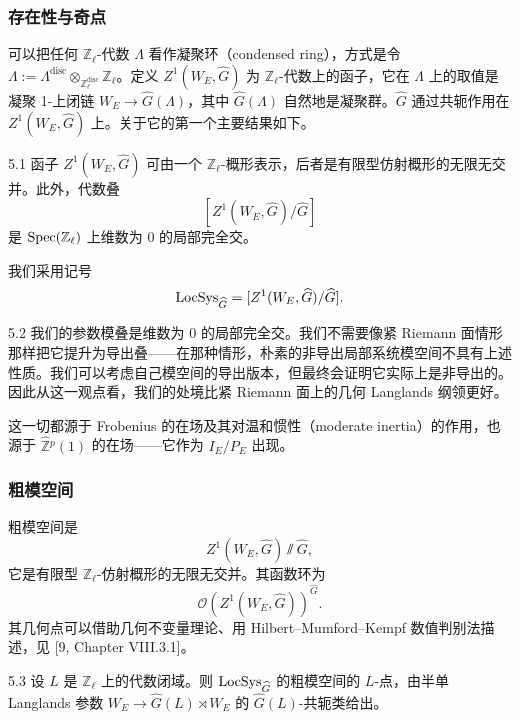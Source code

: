 \subsubsection{存在性与奇点}
可以把任何 $\mathbb{Z}_{\ell}$-代数 $\Lambda$ 看作凝聚环（condensed ring），方式是令 $\Lambda:=\Lambda^{\mathrm{disc}}\otimes_{\mathbb{Z}_{\ell}^{\mathrm{disc}}}\mathbb{Z}_{\ell}$。定义 $Z^{1}(W_{E},\widehat{G})$ 为 $\mathbb{Z}_{\ell}$-代数上的函子，它在 $\Lambda$ 上的取值是凝聚 1-上闭链 $W_{E}\to\widehat{G}(\Lambda)$，其中 $\widehat{G}(\Lambda)$ 自然地是凝聚群。$\widehat{G}$ 通过共轭作用在 $Z^{1}(W_{E},\widehat{G})$ 上。关于它的第一个主要结果如下。

\begin{thm}{5.1}
函子 $Z^{1}(W_{E},\widehat{G})$ 可由一个 $\mathbb{Z}_{\ell}$-概形表示，后者是有限型仿射概形的无限无交并。此外，代数叠
\[
[Z^{1}(W_{E},\widehat{G})/\widehat{G}]
\]
是 $\operatorname{Spec}(\mathbb{Z}_{\ell})$ 上维数为 0 的局部完全交。
\label{thm:a3-5-1}
\end{thm}

我们采用记号
\[
\operatorname{LocSys}_{\widehat{G}}=[Z^{1}(W_{E},\widehat{G})/\widehat{G}].
\]

\begin{rem}{5.2}
我们的参数模叠是维数为 0 的局部完全交。我们不需要像紧 Riemann 面情形那样把它提升为导出叠——在那种情形，朴素的非导出局部系统模空间不具有上述性质。我们可以考虑自己模空间的导出版本，但最终会证明它实际上是非导出的。因此从这一观点看，我们的处境比紧 Riemann 面上的几何 Langlands 纲领更好。
\label{rem:a3-5-2}
\end{rem}

这一切都源于 Frobenius 的在场及其对温和惯性（moderate inertia）的作用，也源于 $\widehat{\mathbb{Z}}{}^{p}(1)$ 的在场——它作为 $I_{E}/P_{E}$ 出现。

\subsubsection{粗模空间}
粗模空间是
\[
Z^{1}(W_{E},\widehat{G})\sslash\widehat{G},
\]
它是有限型 $\mathbb{Z}_{\ell}$-仿射概形的无限无交并。其函数环为
\[
\mathcal{O}(Z^{1}(W_{E},\widehat{G}))^{\widehat{G}}.
\]
其几何点可以借助几何不变量理论、用 Hilbert–Mumford–Kempf 数值判别法描述，见 [9, Chapter VIII.3.1]。

\begin{thm}{5.3}
设 $L$ 是 $\mathbb{Z}_{\ell}$ 上的代数闭域。则 $\operatorname{LocSys}_{\widehat{G}}$ 的粗模空间的 $L$-点，由半单 Langlands 参数 $W_{E}\to\widehat{G}(L)\rtimes W_{E}$ 的 $\widehat{G}(L)$-共轭类给出。
\label{thm:a3-5-3}
\end{thm}

